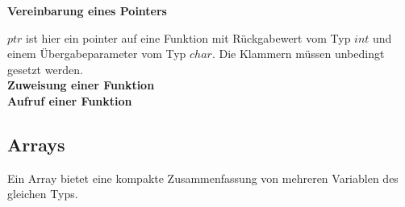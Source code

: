 			\begin{minipage}[t]{10 cm}
				\vspace*{-0.5cm}
			\end{minipage}
			\hspace*{0.5cm}
			\begin{minipage}[t]{8 cm}
				\textbf{Vereinbarung eines Pointers}
					
					$ptr$ ist hier ein pointer auf eine Funktion mit Rückgabewert vom Typ $int$ und einem Übergabeparameter vom Typ $char$. Die Klammern müssen unbedingt gesetzt werden. \\
				
				\textbf{Zuweisung einer Funktion}
					 \ \\
					
				\vspace*{-0.7cm}\textbf{Aufruf einer Funktion}
					
			\end{minipage}
			
	\subsection{Arrays }
		Ein Array bietet eine kompakte Zusammenfassung von mehreren Variablen des gleichen Typs.
		
